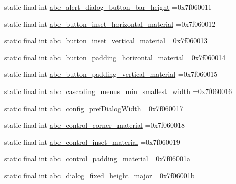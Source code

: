 \begin{DoxyCompactItemize}
\item 
static final int \mbox{\hyperlink{classbr_1_1unb_1_1cic_1_1mp_1_1marketmaster_1_1test_1_1R_1_1dimen_a5c9bb90934d4cd0716d8f01d1025facb}{abc\+\_\+alert\+\_\+dialog\+\_\+button\+\_\+bar\+\_\+height}} =0x7f060011
\item 
static final int \mbox{\hyperlink{classbr_1_1unb_1_1cic_1_1mp_1_1marketmaster_1_1test_1_1R_1_1dimen_a1c060c7cf80778fcfea46801af9ab9a4}{abc\+\_\+button\+\_\+inset\+\_\+horizontal\+\_\+material}} =0x7f060012
\item 
static final int \mbox{\hyperlink{classbr_1_1unb_1_1cic_1_1mp_1_1marketmaster_1_1test_1_1R_1_1dimen_aeb7f1bdb44365cf53d5813e0d318fe5b}{abc\+\_\+button\+\_\+inset\+\_\+vertical\+\_\+material}} =0x7f060013
\item 
static final int \mbox{\hyperlink{classbr_1_1unb_1_1cic_1_1mp_1_1marketmaster_1_1test_1_1R_1_1dimen_a81fa5623b4db84fbd193a64330488acc}{abc\+\_\+button\+\_\+padding\+\_\+horizontal\+\_\+material}} =0x7f060014
\item 
static final int \mbox{\hyperlink{classbr_1_1unb_1_1cic_1_1mp_1_1marketmaster_1_1test_1_1R_1_1dimen_ad973238ffaea7c99bc242b240980c8f1}{abc\+\_\+button\+\_\+padding\+\_\+vertical\+\_\+material}} =0x7f060015
\item 
static final int \mbox{\hyperlink{classbr_1_1unb_1_1cic_1_1mp_1_1marketmaster_1_1test_1_1R_1_1dimen_af6385cf0e5d3137247a874b4b9231252}{abc\+\_\+cascading\+\_\+menus\+\_\+min\+\_\+smallest\+\_\+width}} =0x7f060016
\item 
static final int \mbox{\hyperlink{classbr_1_1unb_1_1cic_1_1mp_1_1marketmaster_1_1test_1_1R_1_1dimen_ae8a58ab5c350e1b3d3213c46b083103a}{abc\+\_\+config\+\_\+pref\+Dialog\+Width}} =0x7f060017
\item 
static final int \mbox{\hyperlink{classbr_1_1unb_1_1cic_1_1mp_1_1marketmaster_1_1test_1_1R_1_1dimen_a98e9965b708571cf3d19f0a02b24d279}{abc\+\_\+control\+\_\+corner\+\_\+material}} =0x7f060018
\item 
static final int \mbox{\hyperlink{classbr_1_1unb_1_1cic_1_1mp_1_1marketmaster_1_1test_1_1R_1_1dimen_ad6626b42297870d5c938f7ed349ca028}{abc\+\_\+control\+\_\+inset\+\_\+material}} =0x7f060019
\item 
static final int \mbox{\hyperlink{classbr_1_1unb_1_1cic_1_1mp_1_1marketmaster_1_1test_1_1R_1_1dimen_ad65fff8af7e8fd378895227d6e3ffac3}{abc\+\_\+control\+\_\+padding\+\_\+material}} =0x7f06001a
\item 
static final int \mbox{\hyperlink{classbr_1_1unb_1_1cic_1_1mp_1_1marketmaster_1_1test_1_1R_1_1dimen_ae5fd774f19ad28f44c5740a8c8163650}{abc\+\_\+dialog\+\_\+fixed\+\_\+height\+\_\+major}} =0x7f06001b

\end{DoxyCompactItemize}
